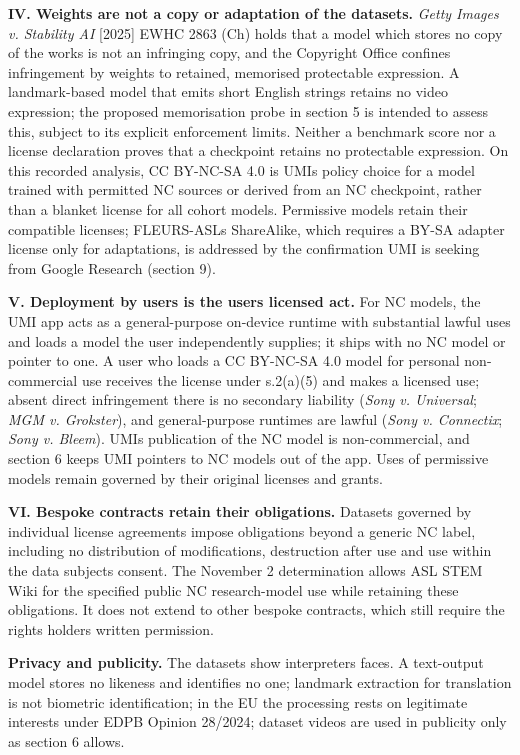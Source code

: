 \documentclass[10pt,a4paper]{article}
\begin{document}
\textbf{IV. Weights are not a copy or adaptation of the datasets.}
\emph{Getty Images v. Stability AI} {[}2025{]} EWHC 2863 (Ch) holds that
a model which stores no copy of the works is not an infringing copy, and
the Copyright Office confines infringement by weights to retained,
memorised protectable expression. A landmark-based model that emits
short English strings retains no video expression; the proposed
memorisation probe in section 5 is intended to assess this, subject to
its explicit enforcement limits. Neither a benchmark score nor a license
declaration proves that a checkpoint retains no protectable expression.
On this recorded analysis, CC BY-NC-SA 4.0 is UMI\textquotesingle s
policy choice for a model trained with permitted NC sources or derived
from an NC checkpoint, rather than a blanket license for all cohort
models. Permissive models retain their compatible licenses;
FLEURS-ASL\textquotesingle s ShareAlike, which requires a BY-SA adapter
license only for adaptations, is addressed by the confirmation UMI is
seeking from Google Research (section 9).

\textbf{V. Deployment by users is the users\textquotesingle{} licensed
act.} For NC models, the UMI app acts as a general-purpose on-device
runtime with substantial lawful uses and loads a model the user
independently supplies; it ships with no NC model or pointer to one. A
user who loads a CC BY-NC-SA 4.0 model for personal non-commercial use
receives the license under s.2(a)(5) and makes a licensed use; absent
direct infringement there is no secondary liability (\emph{Sony v.
Universal}; \emph{MGM v. Grokster}), and general-purpose runtimes are
lawful (\emph{Sony v. Connectix}; \emph{Sony v. Bleem}).
UMI\textquotesingle s publication of the NC model is non-commercial, and
section 6 keeps UMI pointers to NC models out of the app. Uses of
permissive models remain governed by their original licenses and grants.

\textbf{VI. Bespoke contracts retain their obligations.} Datasets governed
by individual license agreements impose obligations beyond a generic
NC label, including no distribution of modifications, destruction after
use and use within the data subjects\textquotesingle{} consent. The
November 2 determination allows ASL STEM Wiki for the specified public
NC research-model use while retaining these obligations. It does not
extend to other bespoke contracts, which still require the rights
holder\textquotesingle s written permission.

\textbf{Privacy and publicity.} The datasets show
interpreters\textquotesingle{} faces. A text-output model stores no
likeness and identifies no one; landmark extraction for translation is
not biometric identification; in the EU the processing rests on
legitimate interests under EDPB Opinion 28/2024; dataset videos are used
in publicity only as section 6 allows.
\end{document}
